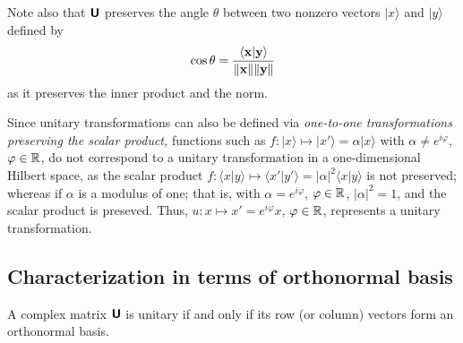 Note also that $\textsf{\textbf{U}}$ preserves the angle $\theta$ between two nonzero vectors $ \vert x \rangle $ and $ \vert y \rangle $  defined by
\begin{equation}
\begin{split}
\cos \theta = \frac{ \langle {\bf x} \vert {\bf y} \rangle } {\|{\bf x}\| \| {\bf y}\| }
\end{split}
\label{2016-m-ch-unitanglepres}
\end{equation}
as it preserves the inner product and the norm.

{%
Since unitary transformations can also be defined via {\em one-to-one transformations preserving the scalar product,}
functions such as
$f: \vert x \rangle \mapsto  \vert x '\rangle  =\alpha  \vert x \rangle $ with $\alpha \neq e^{i\varphi}$, $\varphi \in {\Bbb R}$,
do not correspond to a  unitary transformation in a one-dimensional Hilbert space, as
the scalar product $f:
\langle x \vert y \rangle
\mapsto
\langle x'\vert y'\rangle = \vert \alpha \vert^2 \langle x\vert y\rangle$
is not preserved; whereas if $\alpha$ is a modulus of one; that is,
with $\alpha = e^{i\varphi}$, $\varphi \in {\Bbb R}$,
$\vert \alpha \vert^2=1$, and the scalar product is preseved.
Thus, $u: x \mapsto x' =e^{i\varphi} x$, $\varphi \in {\Bbb R}$,
represents a unitary transformation.
}




\subsection {Characterization in terms of orthonormal basis}
\label{2012-m-ch-citoob}


A complex matrix $\textsf{\textbf{U}}$ is unitary if and only if its row (or column) vectors form
an orthonormal basis.

